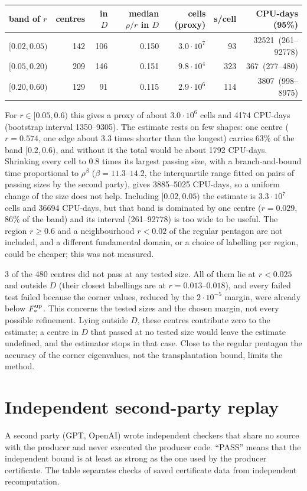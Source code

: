 \documentclass[11pt]{article}
\theoremstyle{remark}
\begin{document}
\begin{center}\small
\begin{tabular}{lrrrrrr}
\toprule
band of $r$ & centres & in $D$ & median $\rho/r$ in $D$ & cells (proxy) & s/cell & CPU-days (95\%)\\
\midrule
$[0.02,0.05)$ & 142 & 106 & 0.150 & $3.0\cdot10^{7}$ & 93 & 32521\ (261--92778)\\
$[0.05,0.20)$ & 209 & 146 & 0.151 & $9.8\cdot10^{4}$ & 323 & 367\ (277--480)\\
$[0.20,0.60)$ & 129 & 91 & 0.115 & $2.9\cdot10^{6}$ & 114 & 3807\ (998--8975)\\
\bottomrule
\end{tabular}
\end{center}

For $r\in[0.05,0.6)$ this gives a proxy of about $3.0\cdot10^{6}$ cells and 4174 CPU-days (bootstrap interval 1350--9305). The estimate rests on few shapes: one centre ($r=0.574$, one edge about 3.3 times shorter than the longest) carries 63\% of the band $[0.2,0.6)$, and without it the total would be about 1792 CPU-days. Shrinking every cell to $0.8$ times its largest passing size, with a branch-and-bound time proportional to $\rho^\beta$ ($\beta=11.3$--$14.2$, the interquartile range fitted on pairs of passing sizes by the second party), gives 3885--5025 CPU-days, so a uniform change of the size does not help. Including $[0.02,0.05)$ the estimate is $3.3\cdot10^{7}$ cells and 36694 CPU-days, but that band is dominated by one centre ($r=0.029$, 86\% of the band) and its interval (261--92778) is too wide to be useful. The region $r\ge0.6$ and a neighbourhood $r<0.02$ of the regular pentagon are not included, and a different fundamental domain, or a choice of labelling per region, could be cheaper; this was not measured.

3 of the 480 centres did not pass at any tested size. All of them lie at $r<0.025$ and outside $D$ (their closest labellings are at $r=0.013$--$0.018$), and every failed test failed because the corner values, reduced by the $2\cdot10^{-5}$ margin, were already below $F_*^{\rm up}$. This concerns the tested sizes and the chosen margin, not every possible refinement. Lying outside $D$, these centres contribute zero to the estimate; a centre in $D$ that passed at no tested size would leave the estimate undefined, and the estimator stops in that case. Close to the regular pentagon the accuracy of the corner eigenvalues, not the transplantation bound, limits the method.

\section{Independent second-party replay}\label{sec:replay}
A second party (GPT, OpenAI) wrote independent checkers that share no source with the producer and never executed the producer code. ``PASS'' means that the independent bound is at least as strong as the one used by the producer certificate. The table separates checks of saved certificate data from independent recomputation.
\end{document}
